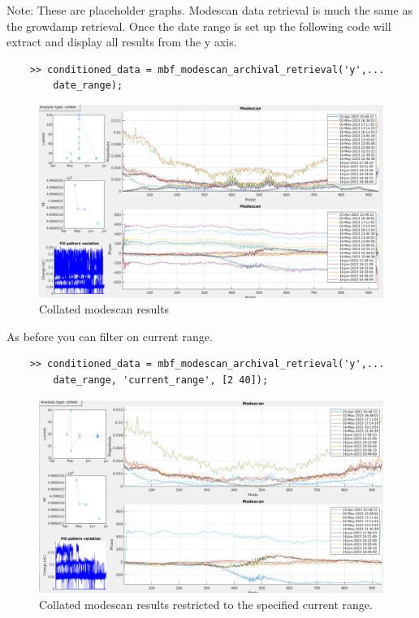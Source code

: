 \documentclass{report}
\begin{document}
Note: These are placeholder graphs. 
\clearpage
Modescan data retrieval is much the same as the growdamp retrieval. Once the date range is set up the following code will extract and display all results from the y axis. 
\begin{verbatim}
    >> conditioned_data = mbf_modescan_archival_retrieval('y',...
        date_range); 
\end{verbatim}
 \begin{figure}[h]
     \centering
     \includegraphics[width=1\linewidth]{modescan_collate.png}
     \caption{Collated modescan results}
     \label{fig:modescan_collate}
 \end{figure}

As before you can filter on current range. 
\begin{verbatim}
    >> conditioned_data = mbf_modescan_archival_retrieval('y',...
        date_range, 'current_range', [2 40]); 
\end{verbatim}
 \begin{figure}[h]
     \centering
     \includegraphics[width=1\linewidth]{modescan_collate_limited_range.png}
     \caption{Collated modescan results restricted to the specified current range.}
     \label{fig:modescan_collate_limited_range}
 \end{figure}
\end{document}

